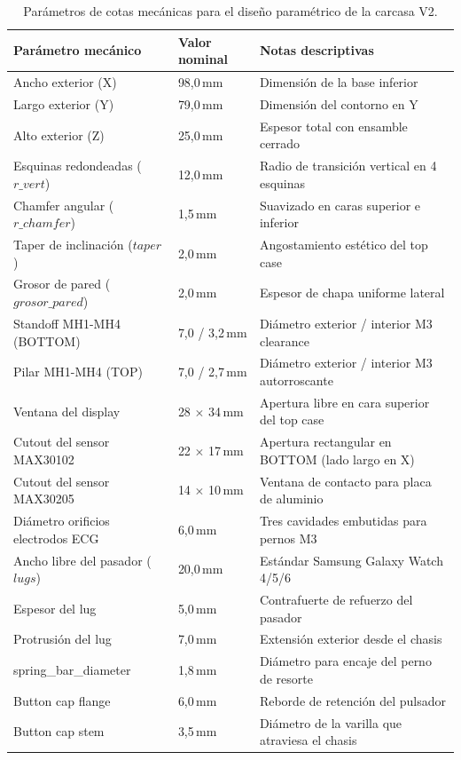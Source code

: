 \documentclass[letterpaper,11pt]{article}
\begin{document}
\begin{table}[H]
\centering
\caption{Parámetros de cotas mecánicas para el diseño paramétrico de la carcasa V2.}
\label{tab:cotas_mecanicas}
\small
\begin{tabular}{lll}
\toprule
\textbf{Parámetro mecánico} & \textbf{Valor nominal} & \textbf{Notas descriptivas} \\
\midrule
Ancho exterior (X) & 98,0\,mm & Dimensión de la base inferior \\
Largo exterior (Y) & 79,0\,mm & Dimensión del contorno en Y \\
Alto exterior (Z) & 25,0\,mm & Espesor total con ensamble cerrado \\
Esquinas redondeadas ($r\_vert$) & 12,0\,mm & Radio de transición vertical en 4 esquinas \\
Chamfer angular ($r\_chamfer$) & 1,5\,mm & Suavizado en caras superior e inferior \\
Taper de inclinación ($taper$) & 2,0\,mm & Angostamiento estético del top case \\
Grosor de pared ($grosor\_pared$) & 2,0\,mm & Espesor de chapa uniforme lateral \\
Standoff MH1-MH4 (BOTTOM) & 7,0 / 3,2\,mm & Diámetro exterior / interior M3 clearance \\
Pilar MH1-MH4 (TOP) & 7,0 / 2,7\,mm & Diámetro exterior / interior M3 autorroscante \\
Ventana del display & 28 $\times$ 34\,mm & Apertura libre en cara superior del top case \\
Cutout del sensor MAX30102 & 22 $\times$ 17\,mm & Apertura rectangular en BOTTOM (lado largo en X) \\
Cutout del sensor MAX30205 & 14 $\times$ 10\,mm & Ventana de contacto para placa de aluminio \\
Diámetro orificios electrodos ECG & 6,0\,mm & Tres cavidades embutidas para pernos M3 \\
Ancho libre del pasador ($lugs$) & 20,0\,mm & Estándar Samsung Galaxy Watch 4/5/6 \\
Espesor del lug & 5,0\,mm & Contrafuerte de refuerzo del pasador \\
Protrusión del lug & 7,0\,mm & Extensión exterior desde el chasis \\
 spring\_bar\_diameter & 1,8\,mm & Diámetro para encaje del perno de resorte \\
 Button cap flange & 6,0\,mm & Reborde de retención del pulsador \\
 Button cap stem & 3,5\,mm & Diámetro de la varilla que atraviesa el chasis \\
\bottomrule
\end{tabular}
\end{table}
\end{document}
